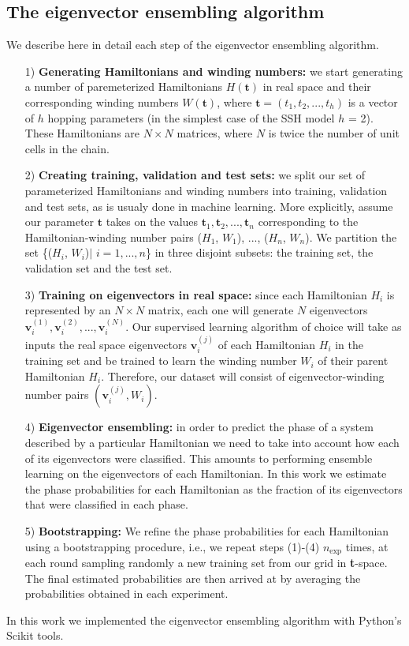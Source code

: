 \documentclass[10pt]{revtex4-1}
\begin{document}
\subsection*{The eigenvector ensembling algorithm}

We describe here in detail each step of the eigenvector ensembling algorithm.
\vspace{.3cm}
\begin{enumerate}%
\item[1)] \textbf{Generating Hamiltonians and winding numbers:} we start generating a number of paremeterized Hamiltonians $H(\mathbf{t})$ in real space and their corresponding winding numbers $W(\mathbf{t})$, where $\mathbf{t} = (t_1, t_2,...,t_h)$ is a vector of $h$ hopping parameters (in the simplest case of the SSH model $h$ = 2). These Hamiltonians are $N\times N$ matrices, where $N$ is twice the number of unit cells in the chain.
\item[2)] \textbf{Creating training, validation and test sets:} we split our set of parameterized Hamiltonians and winding numbers into training, validation and test sets, as is usualy done in machine learning. More explicitly, assume our parameter $\mathbf{t}$ takes on the values $\mathbf{t}_1, \mathbf{t}_2, ..., \mathbf{t}_n$ corresponding to the Hamiltonian-winding number pairs ($H_1$, $W_1$), ..., ($H_n$, $W_n$). We partition the set \{($H_i$, $W_i$)$\mid$ $i=1,...,n$\} in three disjoint subsets: the training set, the validation set and the test set.
\item[3)] \textbf{Training on eigenvectors in real space:} since each Hamiltonian $H_i$ is represented by an $N\times N$ matrix, each one will generate $N$ eigenvectors $\mathbf{v}_i^{(1)}, \mathbf{v}_i^{(2)},...,\mathbf{v}_i^{(N)}$. Our supervised learning algorithm of choice will take as inputs the real space eigenvectors $\mathbf{v}^{(j)}_i$ of each Hamiltonian $H_i$ in the training set and be trained to learn the winding number $W_i$ of their parent Hamiltonian $H_i$. Therefore, our dataset will consist of eigenvector-winding number pairs $(\mathbf{v}_i^{(j)}, W_i)$.
\item[4)]\textbf{Eigenvector ensembling:} in order to predict the phase of a system described by a particular Hamiltonian we need to take into account how each of its eigenvectors were classified. This amounts to performing ensemble learning on the eigenvectors of each Hamiltonian. In this work we estimate the phase probabilities for each Hamiltonian as the fraction of its eigenvectors that were classified in each phase.
\item[5)] \textbf{Bootstrapping:} We refine the phase probabilities for each Hamiltonian using a bootstrapping procedure, i.e., we repeat steps (1)-(4) $n_\text{exp}$ times, at each round sampling randomly a new training set from our grid in \textbf{t}-space. The final estimated probabilities are then arrived at by averaging the probabilities obtained in each experiment.
\end{enumerate}
\vspace{.3cm}
In this work we implemented the eigenvector ensembling algorithm with Python's Scikit tools.
\end{document}
